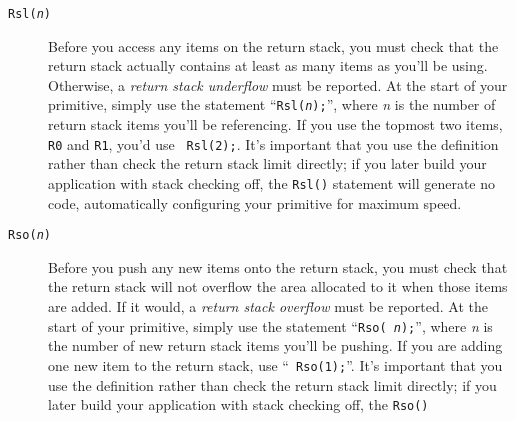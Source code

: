 \documentclass[twocolumn]{article}
\begin{document}
\begin{description}
\item[{\tt Rsl({\em n})}]       Before you access any items on the
                                return stack, you must check that the
                                return stack actually contains at
                                least as many items as you'll be
                                using.  Otherwise, a {\em return stack
                                underflow} must be reported.  At the
                                start of your primitive, simply use
                                the statement ``{\tt Rsl({\em n});}'',
                                where {\em n} is the number of return
                                stack items you'll be referencing.  If
                                you use the topmost two items,
                                {\tt R0} and {\tt R1}, you'd use {\tt
                                Rsl(2);}.  It's important that you use
                                the definition rather than check the
                                return stack limit directly; if you
                                later build your application with
                                stack checking off, the {\tt Rsl()}
                                statement will generate no code,
                                automatically configuring your
                                primitive for maximum speed.
\item[{\tt Rso({\em n})}]       Before you push any new items onto the
                                return stack, you must check that the
                                return stack will not overflow the
                                area allocated to it when those items
                                are added.  If it would, a {\em return
                                stack overflow} must be reported.  At
                                the start of your primitive, simply
                                use the statement ``{\tt Rso({\em
                                n});}'', where {\em n} is the number
                                of new return stack items you'll be
                                pushing.  If you are adding one new
                                item to the return stack, use ``{\tt
                                Rso(1);}''.  It's important that you
                                use the definition rather than check
                                the return stack limit directly; if you
                                later build your application with
                                stack checking off, the {\tt Rso()}

\end{description}
\end{document}
